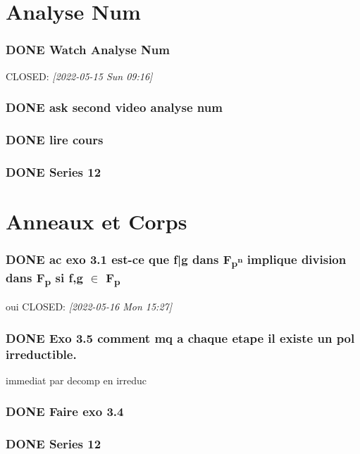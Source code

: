\documentclass[11pt]{article}
\begin{document}
\section{Analyse Num}
\label{sec:org619f0ef}
\subsubsection{{\bfseries\sffamily DONE} Watch Analyse Num}
\label{sec:orgc65b1c1}

CLOSED: \textit{[2022-05-15 Sun 09:16]}
\subsubsection{{\bfseries\sffamily DONE} ask second video analyse num}
\label{sec:orge5f247b}
\subsubsection{{\bfseries\sffamily DONE} lire cours}
\label{sec:orgec6641c}
\subsubsection{{\bfseries\sffamily DONE} Series 12}
\label{sec:org44d1a3e}
\section{Anneaux et Corps}
\label{sec:org4251cd0}
\subsubsection{{\bfseries\sffamily DONE} ac exo 3.1 est-ce que f|g dans F\textsubscript{p\textsuperscript{n}} implique division dans F\textsubscript{p} si f,g \(\in\) F\textsubscript{p}}
\label{sec:orgb2dec98}
oui 
CLOSED: \textit{[2022-05-16 Mon 15:27]}
\subsubsection{{\bfseries\sffamily DONE} Exo 3.5 comment mq a chaque etape il existe un pol irreductible.}
\label{sec:org2dbfb26}
immediat par decomp en irreduc
\subsubsection{{\bfseries\sffamily DONE} Faire exo 3.4}
\label{sec:org9a48bd5}
\subsubsection{{\bfseries\sffamily DONE} Series 12}
\label{sec:org27bf4d8}
\end{document}
